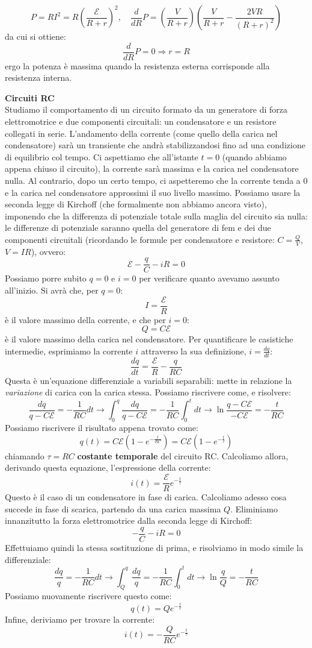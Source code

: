 \documentclass[a4paper,12pt]{article}
\begin{document}
$$ P = RI^2 = R \left(\frac{\mathcal{E}}{R + r}\right)^2, \quad \frac{d}{dR}P = \left( \frac{V}{R+r} \right) \left( \frac{V}{R+r} - \frac{2VR}{(R+r)^2} \right)$$
da cui si ottiene:
$$ \frac{d}{dR}P = 0 \Rightarrow r = R$$
ergo la potenza è massima quando la resistenza esterna corrisponde alla resistenza interna.
\par\smallskip
\textbf{Circuiti RC} \\
Studiamo il comportamento di un circuito formato da un generatore di forza elettromotrice e due componenti circuitali:
un condensatore e un resistore collegati in serie. L'andamento della corrente (come quello della carica nel condensatore) sarà
un transiente che andrà stabilizzandosi fino ad una condizione di equilibrio col tempo. Ci aspettiamo che all'istante $t=0$ (quando abbiamo appena
chiuso il circuito), la corrente sarà massima e la carica nel condensatore nulla. Al contrario, dopo un certo tempo, ci aspetteremo che la corrente
tenda a 0 e la carica nel condensatore approssimi il suo livello massimo. Possiamo usare la seconda legge di Kirchoff (che formalmente non abbiamo ancora visto),
imponendo che la differenza di potenziale totale sulla maglia del circuito sia nulla: le differenze di potenziale saranno quella del generatore di fem e dei due componenti
circuitali (ricordando le formule per condensatore e resistore: $C = \frac{Q}{V}$, $V = IR$), ovvero:
$$ \mathcal{E} - \frac{q}{C} - iR = 0$$
Possiamo porre subito $q = 0$ e $i = 0$ per verificare quanto avevamo assunto all'inizio. Si avrà che, per $q = 0$:
$$ I = \frac{\mathcal{E}}{R} $$
è il valore massimo della corrente, e che per $i = 0$:
$$ Q = C\mathcal{E} $$
è il valore massimo della carica nel condensatore.
Per quantificare le casistiche intermedie, esprimiamo la corrente $i$ attraverso la sua definizione, $i = \frac{dq}{dt}$:
$$ \frac{dq}{dt} = \frac{\mathcal{E}}{R} - \frac{q}{RC} $$
Questa è un'equazione differenziale a variabili separabili: mette in relazione la \textit{variazione} di carica con la carica stessa. Possiamo riscrivere come, e risolvere:
$$ \frac{dq}{q - C\mathcal{E}} = -\frac{1}{RC}dt \rightarrow \int_0^q \frac{dq}{q - C\mathcal{E}} = -\frac{1}{RC}\int_0^t dt \rightarrow \ln{\frac{q-C\mathcal{E}}{-C\mathcal{E}}} = -\frac{t}{RC}  $$
Possiamo riscrivere il risultato appena trovato come:
$$ q(t) = C\mathcal{E}\left(1 - e^{-\frac{t}{RC}}\right) = C\mathcal{E}\left(1 - e^{-\frac{t}{\tau}}\right)$$
chiamando $\tau = RC$ \textbf{costante temporale} del circuito RC. Calcoliamo allora, derivando questa equazione, l'espressione della corrente:
$$ i(t) = \frac{\mathcal{E}}{R}e^{-\frac{t}{\tau}}$$
Questo è il caso di un condensatore in fase di carica. Calcoliamo adesso cosa succede in fase di scarica, partendo da una carica massima $Q$. Eliminiamo innanzitutto
la forza elettromotrice dalla seconda legge di Kirchoff:
$$ -\frac{q}{C} - iR = 0 $$
Effettuiamo quindi la stessa sostituzione di prima, e risolviamo in modo simile la differenziale:
$$ \frac{dq}{q} = -\frac{1}{RC}dt \rightarrow \int_Q^q \frac{dq}{q} = -\frac{1}{RC} \int_0^t dt \rightarrow \ln{\frac{q}{Q}} = -\frac{t}{RC} $$
Possiamo nuovamente riscrivere questo come:
$$ q(t) = Qe^{-\frac{t}{\tau}}$$
Infine, deriviamo per trovare la corrente:
$$ i(t) = -\frac{Q}{RC}e^{-\frac{t}{\tau}} $$
\end{document}

